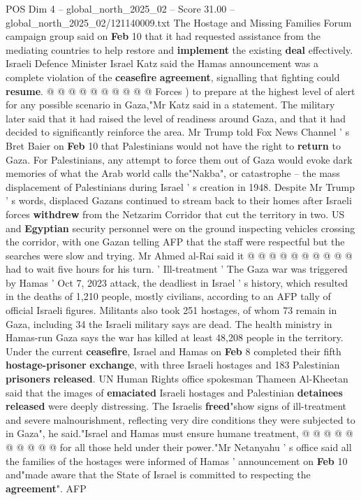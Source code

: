 \begin{textsample}{POS Dim 4 – global\_north\_2025\_02 – Score 31.00 – global\_north\_2025\_02/121140009.txt}
The Hostage and Missing Families Forum campaign group said on \textbf{Feb} 10 that it had requested assistance from the mediating countries to help restore and \textbf{implement} the existing \textbf{deal} effectively.
Israeli Defence Minister Israel Katz said the Hamas announcement was a complete violation of the \textbf{ceasefire} \textbf{agreement}, signalling that fighting could \textbf{resume}. @ @ @ @ @ @ @ @ @ @ Forces ) to prepare at the highest level of alert for any possible scenario in Gaza,"Mr Katz said in a statement.
The military later said that it had raised the level of readiness around Gaza, and that it had decided to significantly reinforce the area.
Mr Trump told Fox News Channel ' s Bret Baier on \textbf{Feb} 10 that Palestinians would not have the right to \textbf{return} to Gaza.
For Palestinians, any attempt to force them out of Gaza would evoke dark memories of what the Arab world calls the"Nakba", or catastrophe -- the mass displacement of Palestinians during Israel ' s creation in 1948.
Despite Mr Trump ' s words, displaced Gazans continued to stream back to their homes after Israeli forces \textbf{withdrew} from the Netzarim Corridor that cut the territory in two.
US and \textbf{Egyptian} security personnel were on the ground inspecting vehicles crossing the corridor, with one Gazan telling AFP that the staff were respectful but the searches were slow and trying.
Mr Ahmed al-Rai said it @ @ @ @ @ @ @ @ @ @ had to wait five hours for his turn. ' Ill-treatment ' The Gaza war was triggered by Hamas ' Oct 7, 2023 attack, the deadliest in Israel ' s history, which resulted in the deaths of 1,210 people, mostly civilians, according to an AFP tally of official Israeli figures.
Militants also took 251 hostages, of whom 73 remain in Gaza, including 34 the Israeli military says are dead.
The health ministry in Hamas-run Gaza says the war has killed at least 48,208 people in the territory.
Under the current \textbf{ceasefire}, Israel and Hamas on \textbf{Feb} 8 completed their fifth \textbf{hostage-prisoner} \textbf{exchange}, with three Israeli hostages and 183 Palestinian \textbf{prisoners} \textbf{released}.
UN Human Rights office spokesman Thameen Al-Kheetan said that the images of \textbf{emaciated} Israeli hostages and Palestinian \textbf{detainees} \textbf{released} were deeply distressing.
The Israelis \textbf{freed}"show signs of ill-treatment and severe malnourishment, reflecting very dire conditions they were subjected to in Gaza", he said."Israel and Hamas must ensure humane treatment, @ @ @ @ @ @ @ @ @ @ for all those held under their power."Mr Netanyahu ' s office said all the families of the hostages were informed of Hamas ' announcement on \textbf{Feb} 10 and"made aware that the State of Israel is committed to respecting the \textbf{agreement}".
AFP

\end{textsample}
